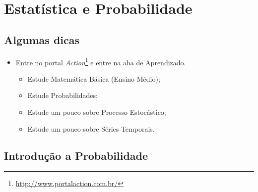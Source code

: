 \chapter{Estatística e Probabilidade}

\section*{Algumas dicas}
\begin{itemize}
    \item Entre no portal \textit{Action}\footnote{\url{http://www.portalaction.com.br/}} e entre na aba de Aprendizado.
    \begin{itemize}
        \item Estude Matemática Básica (Ensino Médio);
        \item Estude Probabilidades;
        \item Estude um pouco sobre Processo Estocástico;
        \item Estude um pouco sobre Séries Temporais.
    \end{itemize}
\end{itemize}

\section{Introdução a Probabilidade}

